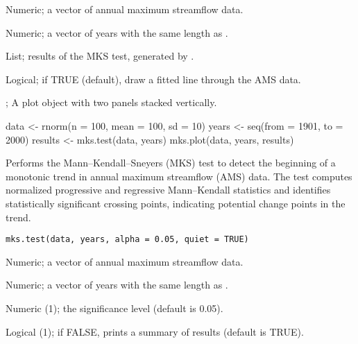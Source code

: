 \documentclass[a4paper]{book}
\begin{document}
%
\begin{Arguments}
\begin{ldescription}
\item[\code{data}] Numeric; a vector of annual maximum streamflow data.

\item[\code{years}] Numeric; a vector of years with the same length as .

\item[\code{results}] List; results of the MKS test, generated by .

\item[\code{show\_trend}] Logical; if TRUE (default), draw a fitted line through the AMS data.
\end{ldescription}
\end{Arguments}
%
\begin{Value}
; A plot object with two  panels stacked vertically.
\end{Value}
%
\begin{SeeAlso}
\end{SeeAlso}
%
\begin{Examples}
\begin{ExampleCode}
data <- rnorm(n = 100, mean = 100, sd = 10)
years <- seq(from = 1901, to = 2000)
results <- mks.test(data, years)
mks.plot(data, years, results)

\end{ExampleCode}
\end{Examples}
%
\begin{Description}
Performs the Mann–Kendall–Sneyers (MKS) test to detect the beginning of a monotonic
trend in annual maximum streamflow (AMS) data. The test computes normalized
progressive and regressive Mann–Kendall statistics and identifies statistically
significant crossing points, indicating potential change points in the trend.
\end{Description}
%
\begin{Usage}
\begin{verbatim}
mks.test(data, years, alpha = 0.05, quiet = TRUE)
\end{verbatim}
\end{Usage}
%
\begin{Arguments}
\begin{ldescription}
\item[\code{data}] Numeric; a vector of annual maximum streamflow data.

\item[\code{years}] Numeric; a vector of years with the same length as .

\item[\code{alpha}] Numeric (1); the significance level (default is 0.05).

\item[\code{quiet}] Logical (1); if FALSE, prints a summary of results (default is TRUE).
\end{ldescription}
\end{Arguments}
\end{document}
